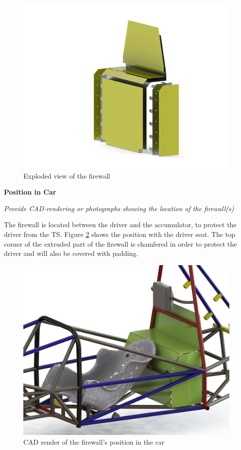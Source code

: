 \documentclass{article}
\begin{document}

            \begin{figure}[H]
                \centering
                \includegraphics[width = 0.6 \textwidth]{ExplodedView}
                \caption{Exploded view of the firewall}
                \label{explodedfirewall}
            \end{figure}

\textbf{Position in Car}

\textit{Provide CAD-rendering or photographs showing the location of the firewall(s)}

            The firewall is located between the driver and the accumulator, to protect the driver from the TS. Figure \ref{firewallposition} shows the position with the driver seat. The top corner of the extruded part of the firewall is chamfered in order to protect the driver and will also be covered with padding.

            \begin{figure}[H]
                \centering
                \includegraphics[width = 0.65 \textwidth]{FullCar2_13_16}
                \caption{CAD render of the firewall's position in the car}
                \label{firewallposition}
            \end{figure}
\end{document}

